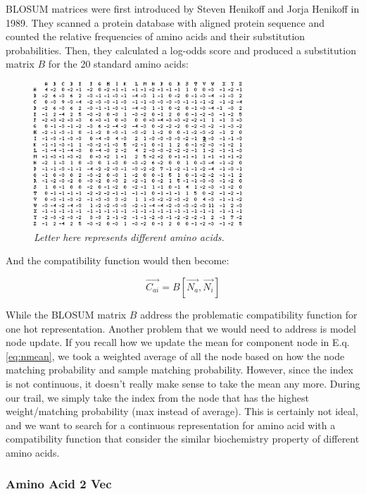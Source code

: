 BLOSUM matrices were first introduced by Steven Henikoff and Jorja Henikoff in 1989. They scanned a protein database with aligned protein sequence and counted the relative frequencies of amino acids and their substitution probabilities. Then, they calculated a log-odds score and produced a substitution matrix $B$ for the 20 standard amino acids:

\begin{figure}[h]
	\centering
	\captionsetup{justification=centering}
	\includegraphics[width=0.7\textwidth]{figs/blosum.png}
	\caption[Caption for LOF]{\emph{Letter here represents different amino acids.}}
	\label{fig:blosum}
\end{figure}

And the compatibility function would then become:

\begin{equation} 
\overrightarrow{C_{ai}}=B[\overrightarrow{N_a},\overrightarrow{N_i}]
\end{equation}

While the BLOSUM matrix $B$ address the problematic compatibility function for one hot representation. Another problem that we would need to address is model node update. If you recall how we update the mean for component node in E.q. \ref{eq:nmean}, we took a weighted average of all the node based on how the node matching probability and sample matching probability. However, since the index is not continuous, it doesn't really make sense to take the mean any more. During our trail, we simply take the index from the node that has the highest weight/matching probability (max instead of average). This is certainly not ideal, and we want to search for a continuous representation for amino acid with a compatibility function that consider the similar biochemistry property of different amino acids.

\subsubsection{Amino Acid 2 Vec}
\label{sssec:a2v}

